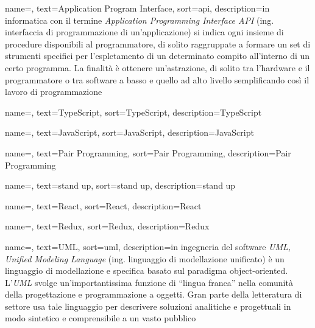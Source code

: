 
\renewcommand{\acronymname}{Acronimi e abbreviazioni}




{
    name=,
    text=Application Program Interface,
    sort=api,
    description={in informatica con il termine \emph{Application Programming Interface API} (ing. interfaccia di programmazione di un'applicazione) si indica ogni insieme di procedure disponibili al programmatore, di solito raggruppate a formare un set di strumenti specifici per l'espletamento di un determinato compito all'interno di un certo programma. La finalità è ottenere un'astrazione, di solito tra l'hardware e il programmatore o tra software a basso e quello ad alto livello semplificando così il lavoro di programmazione}
}

{
    name=,
    text=TypeScript,
    sort=TypeScript,
    description={TypeScript}
}

{
    name=,
    text=JavaScript,
    sort=JavaScript,
    description={JavaScript}
}

{
    name=,
    text=Pair Programming,
    sort=Pair Programming,
    description={Pair Programming}
}

{
    name=,
    text=stand up,
    sort=stand up,
    description={stand up}
}

{
    name=,
    text=React,
    sort=React,
    description={React}
}

{
    name=,
    text=Redux,
    sort=Redux,
    description={Redux}
}

{
    name=,
    text=UML,
    sort=uml,
    description={in ingegneria del software \emph{UML, Unified Modeling Language} (ing. linguaggio di modellazione unificato) è un linguaggio di modellazione e specifica basato sul paradigma object-oriented. L'\emph{UML} svolge un'importantissima funzione di ``lingua franca'' nella comunità della progettazione e programmazione a oggetti. Gran parte della letteratura di settore usa tale linguaggio per descrivere soluzioni analitiche e progettuali in modo sintetico e comprensibile a un vasto pubblico}
}

